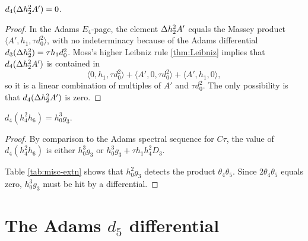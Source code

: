 \begin{lemma}
\label{lem:d4-Dh2^2A'}
$d_4(\Delta h_2^2 A') = 0$.
\end{lemma}

\begin{proof}
In the Adams $E_4$-page, the element $\Delta h_2^2 A'$ equals the 
Massey product $\langle A', h_1, \tau d_0^2 \rangle$,
with no indeterminacy
because of the Adams differential $d_3(\Delta h_2^2) = \tau h_1 d_0^2$.
Moss's higher Leibniz rule \ref{thm:Leibniz}
implies that $d_4(\Delta h_2^2 A')$ is contained in
\[
\langle 0, h_1, \tau d_0^2 \rangle + \langle A', 0, \tau d_0^2 \rangle +
\langle A', h_1, 0 \rangle,
\]
so it is
a linear combination
of multiples of $A'$ and $\tau d_0^2$.
The only possibility is that $d_4(\Delta h_2^2 A')$ is zero.
\end{proof}

\begin{lemma}
\label{lem:d4-h4^2h6}
$d_4(h_4^2 h_6) = h_0^3 g_3$.
\end{lemma}

\begin{proof}
By comparison to 
the Adams spectral sequence for $C\tau$, the value of 
$d_4(h_4^2 h_6)$ is either
$h_0^3 g_3$ or $h_0^3 g_3 + \tau h_1 h_4^2 D_3$.

Table \ref{tab:misc-extn} shows that 
$h_0^2 g_3$ detects the product $\theta_4 \theta_5$.
Since $2 \theta_4 \theta_5$ equals zero, 
$h_0^3 g_3$ must be hit by a differential.
\end{proof}


\section{The Adams $d_5$ differential}
\label{sctn:Adams-d5}


